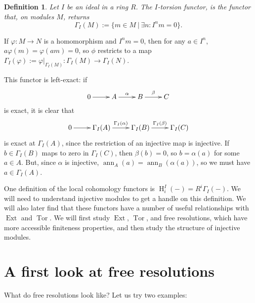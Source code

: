 \documentclass[11pt]{book}
\newtheorem{definition}[theorem]{Definition}
\numberwithin{equation}{section}
\numberwithin{theorem}{chapter}
\theoremstyle{definition}
\newtheorem*{basic properties}{Basic Properties}
\newtheorem*{Important Remark}{Important Remark}
\theoremstyle{remark}
\newcommand{\Ext}{\operatorname{Ext}}
\newcommand{\Tor}{\operatorname{Tor}}
\newcommand{\ann}{\operatorname{ann}}
\renewcommand{\H}{\operatorname{H}}
\begin{document}
\begin{definition}
	Let $I$ be an ideal in a ring $R$. The \emph{$I$-torsion functor}, is the functor that, on modules $M$, returns
	\[ \Gamma_I(M):=\{ m \in M \ | \ \exists n : I^n m = 0\}.\]
\end{definition}
If $\varphi:M\rightarrow N$ is a homomorphism and $I^n m =0$, then for any $a\in I^n$, $a \varphi(m)=\varphi(am)=0$, so $\phi$ restricts to a map $\Gamma_I(\varphi):=\varphi|_{\Gamma_I(M)}:\Gamma_I(M)\rightarrow \Gamma_I(N)$.

	
	This functor is left-exact: if 	$$\xymatrix{0 \ar[r] & A \ar[r]^-{\alpha} & B \ar[r]^{\beta} & C }$$ is exact, it is clear that $$\xymatrix{ 0 \ar[r] & \Gamma_I(A) \ar[r]^-{\Gamma_I(\alpha)} & \Gamma_I(B) \ar[r]^-{\Gamma_I(\beta)} & \Gamma_I(C) }$$ is exact at $\Gamma_I(A)$, since the restriction of an injective map is injective. If $b\in\Gamma_I(B)$ maps to zero in $\Gamma_I(C)$, then $\beta(b)=0$, so $b=\alpha(a)$ for some $a\in A$. But, since $\alpha$ is injective, $\ann_A(a)=\ann_B(\alpha(a))$, so we must have $a\in \Gamma_I(A)$.
	
	One definition of the local cohomology functors is $\H_i^I(-)=R^i \Gamma_I (-)$. We will need to understand injective modules to get a handle on this definition. We will also later find that these functors have a number of useful relationships with $\Ext$ and $\Tor$. We will first study $\Ext$, $\Tor$, and free resolutions, which have more accessible finiteness properties, and then study the structure of injective modules.





\section{A first look at free resolutions}


What do free resolutions look like? Let us try two examples:
\end{document}
